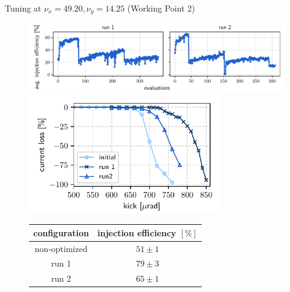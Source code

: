 \documentclass[aspectratio=169]{beamer}
\begin{document}
\begin{frame}{Tuning at $\nu_x = 49.20, \nu_y = 14.25$ (Working Point 2)}
    \begin{minipage}{0.55\textwidth}
        \begin{figure}
            \centering
            \includegraphics[width=\textwidth]{newtunes_history.pdf}
            \includegraphics[width = 0.75\textwidth]{WEPL087_f3.pdf}
            \begin{table}[]
                \scriptsize
                \begin{tabular}{cc}
                \hline
                configuration & injection efficiency $[\%]$  \\ \hline
                non-optimized    & $51\pm1$                   \\
                run 1            & $79\pm3$                    \\
                run 2            & $65\pm1$                     \\ \hline
                \end{tabular}
                \end{table}
        \end{figure}
    \end{minipage}
    \hfill
    \begin{minipage}{0.44\textwidth}
        \begin{figure}
            \centering

\end{figure}
\end{minipage}
\end{frame}
\end{document}

